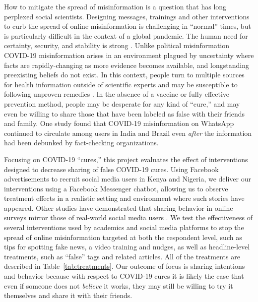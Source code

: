 \documentclass[letterpaper, 12pt, parskip=full,]{scrartcl}
\begin{document}

How to mitigate the spread of misinformation is a question that has long perplexed social scientists. Designing messages, trainings and other interventions to curb the spread of online misinformation is challenging in ``normal'' times, but is particularly difficult in the context of a global pandemic. The human need for certainty, security, and stability is strong \citep{leotti2010born}. Unlike political misinformation COVID-19 misinformation arises in an environment plagued by uncertainty where facts are rapidly-changing as more evidence becomes available, and longstanding preexisting beliefs do not exist.  In this context, people turn to multiple sources for health information outside of scientific experts and may be susceptible to following unproven remedies \citep{swire2020public}. In the absence of a vaccine or fully effective prevention method, people may be desperate for any kind of ``cure,'' and may even be willing to share those that have been labeled as false with their friends and family. One study found that COVID-19 misinformation on WhatsApp continued to circulate among users in India and Brazil even \textit{after} the information had been debunked by fact-checking organizations. 





Focusing on COVID-19 ``cures,'' this project evaluates the effect of interventions designed to decrease sharing of false COVID-19 cures. Using Facebook advertisements to recruit social media users in Kenya and Nigeria, we deliver our interventions using a Facebook Messenger chatbot, allowing us to observe treatment effects in a realistic setting and environment where such stories have appeared. Other studies have demonstrated that sharing behavior in online surveys mirror those of real-world social media users \citep{mosleh2020self}. We test the effectiveness of several interventions used by academics and social media platforms to stop the spread of online misinformation targeted at both the respondent level, such as tips for spotting fake news, a video training and nudges, as well as headline-level treatments, such as ``false'' tags and related articles. All of the treatments are described in Table~\ref{tab:treatments}. Our outcome of focus is sharing intentions and behavior because with respect to COVID-19 cures it is likely the case that even if someone does not \textit{believe} it works, they may still be willing to try it themselves and share it with their friends.
\end{document}
